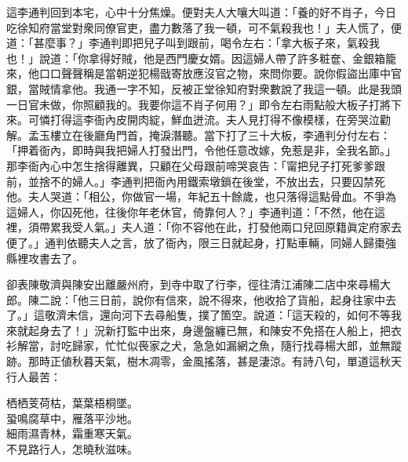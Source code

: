 這李通判回到本宅，心中十分焦燥。便對夫人大嚷大叫道：「養的好不肖子，今日吃徐知府當堂對衆同僚官吏，盡力數落了我一頓，可不氣殺我也！」夫人慌了，便道：「甚麼事？」李通判即把兒子叫到跟前，喝令左右：「拿大板子來，氣殺我也！」說道：「你拿得好賊，他是西門慶女婿。因這婦人帶了許多粧奩、金銀箱籠來，他口口聲聲稱是當朝逆犯楊戩寄放應沒官之物，來問你要。說你假盜出庫中官銀，當賊情拿他。我通一字不知，反被正堂徐知府對衆數說了我這一頓。此是我頭一日官未做，你照顧我的。我要你這不肖子何用？」即令左右雨點般大板子打將下來。可憐打得這李衙內皮開肉綻，鮮血迸流。夫人見打得不像模樣，在旁哭泣勸解。孟玉樓立在後廳角門首，掩淚潛聽。當下打了三十大板，李通判分付左右：「押着衙內，即時與我把婦人打發出門，令他任意改嫁，免惹是非，全我名節。」那李衙內心中怎生捨得離異，只顧在父母跟前啼哭哀告：「甯把兒子打死爹爹跟前，並捨不的婦人。」李通判把衙內用鐵索墩鎖在後堂，不放出去，只要囚禁死他。夫人哭道：「相公，你做官一場，年紀五十餘歲，也只落得這點骨血。不爭為這婦人，你囚死他，往後你年老休官，倚靠何人？」{}{}李通判道：「不然，他在這裡，須帶累我受人氣。」夫人道：「你不容他在此，打發他兩口兒回原籍眞定府家去便了。」{}通判依聽夫人之言，放了衙內，限三日就起身，打點車輛，同婦人歸棗強縣裡攻書去了。

卻表陳敬濟與陳安出離嚴州府，到寺中取了行李，徑往清江浦陳二店中來尋楊大郎。陳二說：「他三日前，說你有信來，說不得來，他收拾了貨船，起身往家中去了。」{}這敬濟未信，還向河下去尋船隻，撲了箇空。說道：「這天殺的，如何不等我來就起身去了！」{}況新打監中出來，身邊盤纏已無，和陳安不免搭在人船上，把衣衫解當，討吃歸家，忙忙似䘮家之犬，急急如漏網之魚，隨行找尋楊大郎，並無蹤跡。那時正値秋暮天氣，樹木凋零，金風搖落，甚是淒涼。有詩八句，單道這秋天行人最苦：

\begin{myquote}
栖栖芰荷枯，葉葉梧桐墜。\\蛩鳴腐草中，雁落平沙地。\\細雨濕青林，霜重寒天氣。\\不見路行人，怎曉秋滋味。
\end{myquote}

